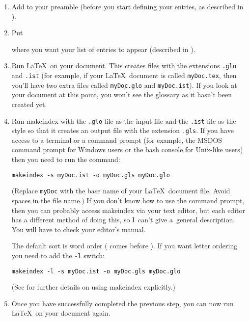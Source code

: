 \documentclass[report,inlinetitle]{nlctdoc}
\begin{document}
\begin{description}
   \begin{enumerate}
    \item Add  to your preamble (before you start
    defining your entries, as described in
    ).

    \item Put
\begin{definition}
\end{definition}
    where you want your list of entries to appear (described in
    ).

    \item Run \LaTeX\ on your document. This creates files with the
    extensions \texttt{.glo} and \texttt{.ist} (for example, if your 
    \LaTeX\ document is called \texttt{myDoc.tex}, then you'll have 
    two extra files called \texttt{myDoc.glo} and \texttt{myDoc.ist}).
    If you look at your document at this point, you won't see the 
    glossary as it hasn't been created yet.

    \item Run \gls{makeindex} with the \texttt{.glo} file as the
    input file and the \texttt{.ist} file as the style so that
    it creates an output file with the extension \texttt{.gls}. If
    you have access to a terminal or a command prompt (for example, the
    MSDOS command prompt for Windows users or the bash console for
    Unix-like users) then you need to run the command:
\begin{verbatim}
makeindex -s myDoc.ist -o myDoc.gls myDoc.glo
\end{verbatim}
   (Replace \texttt{myDoc} with the base name of your \LaTeX\
    document file. Avoid spaces in the file name.) If you don't know
    how to use the command prompt, then you can probably access
    \gls{makeindex} via your text editor, but each editor has a
    different method of doing this, so I~can't give a~general
    description. You will have to check your editor's manual.

    The default sort is word order ( comes before
). 
    If you want letter ordering you need to add the \texttt{-l}
    switch:
\begin{verbatim}
makeindex -l -s myDoc.ist -o myDoc.gls myDoc.glo
\end{verbatim}
    (See  for further details on using 
    \gls*{makeindex} explicitly.)

    \item Once you have successfully completed the previous step,
    you can now run \LaTeX\ on your document again.
   \end{enumerate}


\end{description}
\end{document}
